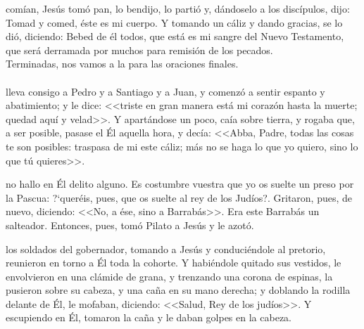 \documentclass[10pt,twoside]{book}
\begin{document}
comían, Jesús tomó pan, lo bendijo, lo partió y, dándoselo a los discípulos, dijo: Tomad y comed, éste es mi cuerpo. 
Y tomando un cáliz y dando gracias, se lo dió, diciendo: Bebed de él todos, que está es mi sangre del Nuevo Testamento, que será derramada por muchos 
para remisión de los pecados.\\[2mm]
{} Terminadas, nos vamos a la  para las oraciones finales.\\[5mm]

\\[4mm]
\vspace{2mm}
\space lleva consigo a Pedro y a Santiago y a Juan, y comenzó a sentir espanto y abatimiento; y le dice: <<triste en gran manera está mi corazón hasta la muerte;
quedad aquí y velad>>. Y apartándose un poco, caía sobre tierra, y rogaba que, a ser posible, pasase el Él aquella hora, y decía: <<Abba, Padre, todas las cosas te son posibles:
traspasa de mi este cáliz; más no se haga lo que yo quiero, sino lo que tú quieres>>.\\[-2mm]

\vspace{5mm}

\vspace{2mm}
no hallo en Él delito alguno. Es costumbre vuestra que yo os suelte un preso por la Pascua: {?`}queréis, 
pues, que os suelte al rey de los Judíos?\guillemotright. Gritaron, pues, de nuevo, diciendo: <<No, a ése, sino a Barrabás>>. 
Era este Barrabás un salteador. Entonces, pues, tomó Pilato a Jesús y le azotó.\\[2mm]

\vspace{5mm}

\vspace{2mm}
los soldados del gobernador, tomando a Jesús y conduciéndole al pretorio, reunieron en torno a Él toda la cohorte. 
Y habiéndole quitado sus vestidos, le envolvieron en una clámide de grana, y trenzando una corona de espinas, la pusieron sobre su cabeza, 
y una caña en su mano derecha; y doblando la rodilla delante de Él, le mofaban, diciendo: <<Salud, Rey de los judíos>>. Y escupiendo en Él, 
tomaron la caña y le daban golpes en la cabeza.\\[2mm]

\vspace{5mm}
\end{document}
